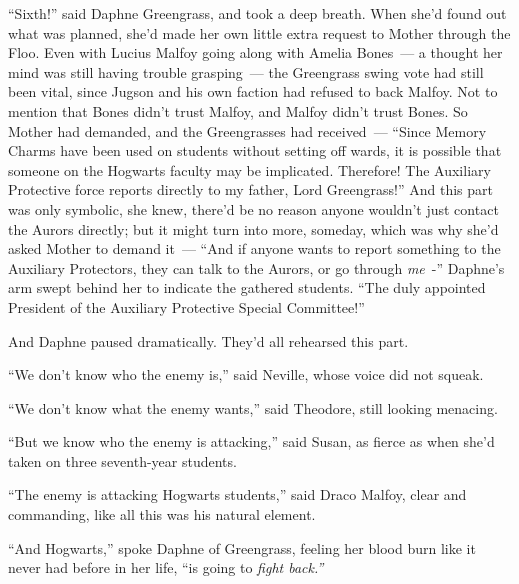 ``Sixth!'' said Daphne Greengrass, and took a deep breath. When she'd found out what was planned, she'd made her own little extra request to Mother through the Floo. Even with Lucius Malfoy going along with Amelia Bones~--- a thought her mind was still having trouble grasping~--- the Greengrass swing vote had still been vital, since Jugson and his own faction had refused to back Malfoy. Not to mention that Bones didn't trust Malfoy, and Malfoy didn't trust Bones. So Mother had demanded, and the Greengrasses had received~--- ``Since Memory Charms have been used on students without setting off wards, it is possible that someone on the Hogwarts faculty may be implicated. Therefore! The Auxiliary Protective force reports directly to my father, Lord Greengrass!'' And this part was only symbolic, she knew, there'd be no reason anyone wouldn't just contact the Aurors directly; but it might turn into more, someday, which was why she'd asked Mother to demand it~--- ``And if anyone wants to report something to the Auxiliary Protectors, they can talk to the Aurors, or go through \emph{me}~-'' Daphne's arm swept behind her to indicate the gathered students. ``The duly appointed President of the Auxiliary Protective Special Committee!''

And Daphne paused dramatically. They'd all rehearsed this part.

``We don't know who the enemy is,'' said Neville, whose voice did not squeak.

``We don't know what the enemy wants,'' said Theodore, still looking menacing.

``But we know who the enemy is attacking,'' said Susan, as fierce as when she'd taken on three seventh-year students.

``The enemy is attacking Hogwarts students,'' said Draco Malfoy, clear and commanding, like all this was his natural element.

``And Hogwarts,'' spoke Daphne of Greengrass, feeling her blood burn like it never had before in her life, ``is going to \emph{fight back.''}
